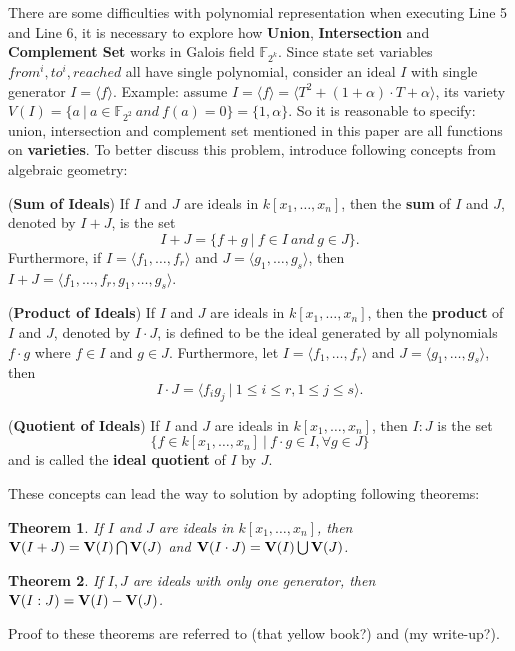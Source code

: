 \documentclass{acm_proc_article-sp}
\newtheorem{Theorem}{Theorem}
\begin{document}
There are some difficulties with polynomial representation when executing Line 5 and Line 6, it is necessary to explore
how \textbf{Union}, \textbf{Intersection} and \textbf{Complement Set} works in Galois field $\mathbb{F}_{2^k}$. Since
state set variables $from^i, to^i, reached$ all have single polynomial, consider an ideal $I$ with single generator $I = \langle f\rangle $.
Example: assume $I = \langle f\rangle  = \langle T^2 + (1+\alpha)\cdot T+\alpha\rangle $, its variety $V(I) = \{a\ |\ a \in \mathbb{F}_{2^2}\ and\ f(a) = 0\} = \{1, \alpha\}$.
So it is reasonable to specify: union, intersection and complement set mentioned in this paper are all functions on \textbf{varieties}.
To better discuss this problem, introduce following concepts from algebraic geometry:
\begin{Definition}
\label{def:sum}
({\bf Sum of Ideals}) If $I$ and $J$ are ideals in $k[x_1, \dots, x_n]$, then the 
{\bf sum} of $I$ and $J$, denoted by $I + J$, is the set
  \begin{equation}
  I + J = \{f + g\ |\ f \in I \ and\  g \in J\}.
  \end{equation}
Furthermore, if $I = \langle f_1, \dots, f_r\rangle$ and 
$J = \langle g_1, \dots, g_s\rangle$, then 
$I + J = \langle f_1, \dots, f_r, g_1, \dots, g_s\rangle$.
\end{Definition}
\begin{Definition}
\label{def:prod}
({\bf Product of Ideals}) If $I$ and $J$ are ideals in $k[x_1, \dots, x_n]$, then the
{\bf product} of $I$ and $J$, denoted by $I \cdot J$, is defined to be the ideal generated 
by all polynomials $f \cdot g$ where $f \in I$ and $g \in J$. Furthermore, let
$I = \langle f_1, \dots, f_r\rangle$ and $J = \langle g_1, \dots, g_s\rangle$, then
  \begin{equation}
  I \cdot J = \langle f_ig_j\ |\ 1 \leq i \leq r, 1 \leq j \leq s\rangle .
  \end{equation}
\end{Definition}
\begin{Definition}
({\bf Quotient of Ideals}) If $I$ and $J$ are ideals in $k[x_1, \dots, x_n]$, then $I:J$
is the set
  \begin{equation}
  \{f \in k[x_1, \dots, x_n]\ |\ f\cdot g \in I, \forall g \in J\}
  \end{equation}
and is called the {\bf ideal quotient} of $I$ by $J$.
\end{Definition}
These concepts can lead the way to solution by adopting following theorems:
\begin{Theorem}
\label{thm:unionintersect}
If $I$ and $J$ are ideals in $k[x_1, \dots, x_n]$, then ${\bf V}(I + J) = {\bf V}(I)
\bigcap {\bf V}(J)$ and ${\bf V}(I \cdot J) = {\bf V}(I) \bigcup {\bf V}(J)$.
\end{Theorem}
\begin{Theorem}
\label{thm:quotient}
If $I, J$ are ideals with only one generator, then ${\bf V}(I:J) ={\bf V}(I) - {\bf V}(J)$.
\end{Theorem}
Proof to these theorems are referred to (that yellow book?) and (my write-up?).
\end{document}
